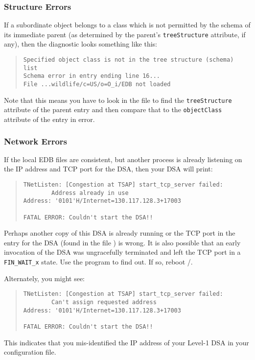 \subsubsection	{Structure Errors}
If a subordinate object belongs to a class which is not permitted by
the schema of its immediate parent
(as determined by the parent's \verb"treeStructure" attribute, if any),
then the diagnostic looks something like this:
\begin{quote}\small\begin{verbatim}
Specified object class is not in the tree structure (schema) list
Schema error in entry ending line 16...
File ...wildlife/c=US/o=O_i/EDB not loaded
\end{verbatim}\end{quote}
Note that this means you have to look in the file 
to find the \verb"treeStructure" attribute of the parent entry
and then compare that to the \verb"objectClass" attribute of the entry
in error.

\subsubsection	{Network Errors}
If the local EDB files are consistent,
but another process is already listening on the IP address and TCP
port for the DSA,
then your DSA will print:
\begin{quote}\small\begin{verbatim}
TNetListen: [Congestion at TSAP] start_tcp_server failed:
        Address already in use
Address: '0101'H/Internet=130.117.128.3+17003

FATAL ERROR: Couldn't start the DSA!!
\end{verbatim}\end{quote}
Perhaps another copy of this DSA is already running
or the TCP port in the entry for the DSA
(found in the file )
is wrong.
It is also possible that an early invocation of the DSA was ungracefully
terminated and left the TCP port in a \verb"FIN_WAIT_x" state.
Use the  program to find out.
If so,
reboot \unix/.

Alternately, you might see:
\begin{quote}\small\begin{verbatim}
TNetListen: [Congestion at TSAP] start_tcp_server failed:
        Can't assign requested address
Address: '0101'H/Internet=130.117.128.3+17003

FATAL ERROR: Couldn't start the DSA!!
\end{verbatim}\end{quote}
This indicates that you mis-identified the IP address of your Level-1 DSA in
your  configuration file.

